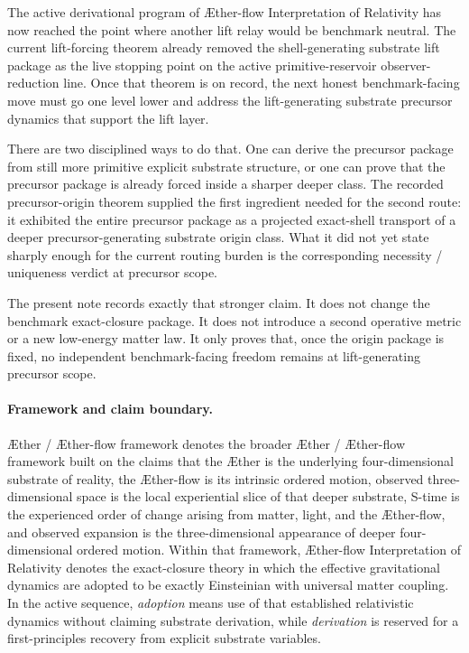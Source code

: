 \documentclass[11pt]{article}
\newcommand{\Aether}{\AE{}ther}
\newcommand{\Aflow}{\AE{}ther-flow}
\newcommand{\TheoryName}{\Aflow{} Interpretation of Relativity}
\newcommand{\TheoryProgram}{\Aether{} / \Aflow{} framework}
\begin{document}
The active derivational program of \TheoryName{} has now reached the point where another lift relay would be benchmark neutral. The current lift-forcing theorem already removed the shell-generating substrate lift package as the live stopping point on the active primitive-reservoir observer-reduction line. Once that theorem is on record, the next honest benchmark-facing move must go one level lower and address the lift-generating substrate precursor dynamics that support the lift layer.

There are two disciplined ways to do that. One can derive the precursor package from still more primitive explicit substrate structure, or one can prove that the precursor package is already forced inside a sharper deeper class. The recorded precursor-origin theorem supplied the first ingredient needed for the second route: it exhibited the entire precursor package as a projected exact-shell transport of a deeper precursor-generating substrate origin class. What it did not yet state sharply enough for the current routing burden is the corresponding necessity / uniqueness verdict at precursor scope.

The present note records exactly that stronger claim. It does not change the benchmark exact-closure package. It does not introduce a second operative metric or a new low-energy matter law. It only proves that, once the origin package is fixed, no independent benchmark-facing freedom remains at lift-generating precursor scope.

\paragraph{Framework and claim boundary.}
\TheoryProgram{} denotes the broader \Aether{} / \Aflow{} framework built on the claims that the \Aether{} is the underlying four-dimensional substrate of reality, the \Aflow{} is its intrinsic ordered motion, observed three-dimensional space is the local experiential slice of that deeper substrate, S-time is the experienced order of change arising from matter, light, and the \Aflow{}, and observed expansion is the three-dimensional appearance of deeper four-dimensional ordered motion. Within that framework, \TheoryName{} denotes the exact-closure theory in which the effective gravitational dynamics are adopted to be exactly Einsteinian with universal matter coupling. In the active sequence, \emph{adoption} means use of that established relativistic dynamics without claiming substrate derivation, while \emph{derivation} is reserved for a first-principles recovery from explicit substrate variables.
\end{document}
